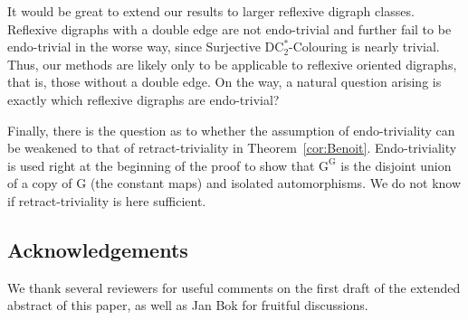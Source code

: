 \documentclass[a4paper,12pt]{article}
\theoremstyle{remark}
\newcommand{\DC}[0]{\ensuremath{\mathrm{DC}}}
\newcommand{\G}{\ensuremath{\mathrm{G}}}
\begin{document}
It would be great to extend our results to larger reflexive digraph classes. Reflexive digraphs with a double edge are not endo-trivial and further fail to be endo-trivial in the worse way, since {\sc Surjective $\DC^*_2$-Colouring} is nearly trivial. Thus, our methods are likely only to be applicable to reflexive oriented digraphs, that is, those without a double edge. On the way, a natural question arising is exactly which reflexive digraphs are endo-trivial?

Finally, there is the question as to whether the assumption of endo-triviality can be weakened to that of retract-triviality in Theorem~\ref{cor:Benoit}. Endo-triviality is used right at the beginning of the proof to show that $\G^\G$ is the disjoint union of a copy of $\G$ (the constant maps) and isolated automorphisms. We do not know if retract-triviality is here sufficient.

\subsection*{Acknowledgements} We thank several reviewers for useful comments on the first draft of the extended abstract of this paper, as well as Jan Bok for fruitful discussions.
\end{document}
